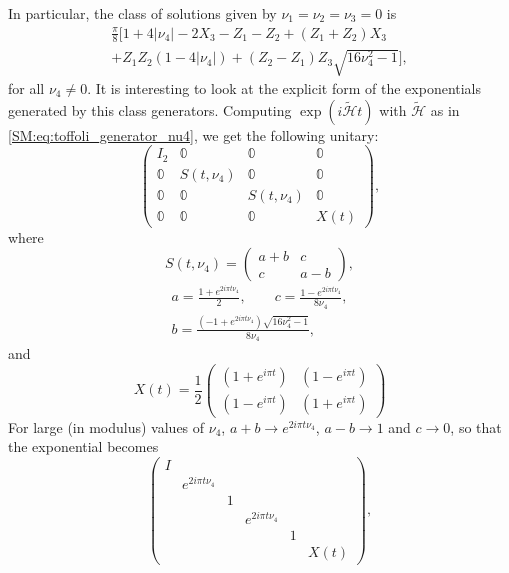 In particular, the class of solutions given by $\nu_1 = \nu_2 = \nu_3 = 0$ is
\begin{equation}
\begin{split}
	\frac{\pi}{8} \bigg[
	1 + 4\lvert\nu_4\rvert
	- 2 X_3 - Z_1 - Z_2
	+ (Z_1 + Z_2) X_3 \\
	+ Z_1 Z_2 (1 - 4\lvert\nu_4 \rvert)
	+ (Z_2 - Z_1) Z_3 \sqrt{16\nu_4^2 - 1}
	\bigg],
\end{split}
\label{SM:eq:toffoli_generator_nu4}
\end{equation}
for all $\nu_4\neq 0$.
It is interesting to look at the explicit form of the exponentials
generated by this class generators.
Computing $\exp(i \tilde{\mathcal H} t)$ with $\tilde{\mathcal H}$ as in \cref{SM:eq:toffoli_generator_nu4}, we get the following unitary:
\begin{equation}
	\begin{pmatrix}
		I_2 & \mathbb0 & \mathbb0 & \mathbb0 \\
		\mathbb0 & S(t, \nu_4) & \mathbb0 & \mathbb0 \\
		\mathbb0 & \mathbb0 & S(t, \nu_4) & \mathbb0 \\
		\mathbb0 & \mathbb0 & \mathbb0 & X(t)
	\end{pmatrix},
\end{equation}
where
\begin{equation}
	S(t, \nu_4) = \begin{pmatrix}
		a + b & c \\
		c & a - b
	\end{pmatrix},
\end{equation}
\begin{equation}
\begin{gathered}
	a = \frac{1 + e^{2i\pi t \nu_4}}{2},
	\qquad c = \frac{1 - e^{2i\pi t \nu_4}}{8\nu_4},  \\
	b = \frac{(-1 + e^{2i\pi t \nu_4})\sqrt{16\nu_4^2 - 1}}{8\nu_4},
\end{gathered}
\end{equation}
and
\begin{equation}
	X(t) = \frac{1}{2} \begin{pmatrix}
		(1 + e^{i\pi t}) & (1 - e^{i\pi t}) \\
		(1 - e^{i\pi t}) & (1 + e^{i\pi t})
	\end{pmatrix}
\end{equation}
For large (in modulus) values of $\nu_4$,
$a + b \to e^{2i\pi t \nu_4}$, $a - b \to 1$ and $c\to0$,
so that the exponential becomes
\begin{equation}
	\begin{pmatrix}
		I & & & & &\\
		& e^{2i\pi t \nu_4} & & & & \\
		& & 1 & & & \\
		& & & e^{2i\pi t \nu_4} & & \\
		& & & & 1 & \\
		& & & & & X(t)
	\end{pmatrix},
\end{equation}
